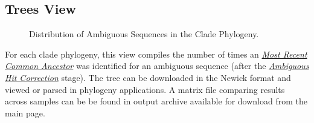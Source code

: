 \documentclass[letterpaper,10pt,english]{sphinxmanual}
\begin{document}
\subsection{Trees View}
\label{Web:trees-view}\begin{figure}[htbp]
\centering
\capstart

\caption{Distribution of Ambiguous Sequences in the Clade Phylogeny.}\end{figure}

For each clade phylogeny, this view compiles the number of times an {\hyperref[defs:mrca]{\emph{Most Recent Common Ancestor}}}
was identified for an ambiguous sequence (after the {\hyperref[defs:multiple-hits]{\emph{Ambiguous Hit Correction}}} stage).
The tree can be downloaded in the Newick format and viewed or parsed in phylogeny
applications. A matrix file comparing results across samples can be be found in
output archive available for download from the main page.
\end{document}
